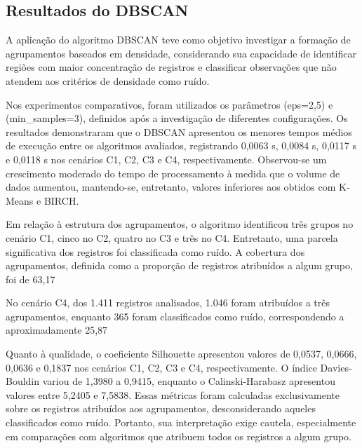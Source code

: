 \documentclass[lettersize,journal]{IEEEtran}
\begin{document}
\subsection{Resultados do DBSCAN}
A aplicação do algoritmo DBSCAN teve como objetivo investigar a formação de agrupamentos baseados em densidade, considerando sua capacidade de identificar regiões com maior concentração de registros e classificar observações que não atendem aos critérios de densidade como ruído.

Nos experimentos comparativos, foram utilizados os parâmetros (eps=2,5) e (min\_samples=3), definidos após a investigação de diferentes configurações. Os resultados demonstraram que o DBSCAN apresentou os menores tempos médios de execução entre os algoritmos avaliados, registrando 0,0063 s, 0,0084 s, 0,0117 s e 0,0118 s nos cenários C1, C2, C3 e C4, respectivamente. Observou-se um crescimento moderado do tempo de processamento à medida que o volume de dados aumentou, mantendo-se, entretanto, valores inferiores aos obtidos com K-Means e BIRCH.

Em relação à estrutura dos agrupamentos, o algoritmo identificou três grupos no cenário C1, cinco no C2, quatro no C3 e três no C4. Entretanto, uma parcela significativa dos registros foi classificada como ruído. A cobertura dos agrupamentos, definida como a proporção de registros atribuídos a algum grupo, foi de 63,17%

No cenário C4, dos 1.411 registros analisados, 1.046 foram atribuídos a três agrupamentos, enquanto 365 foram classificados como ruído, correspondendo a aproximadamente 25,87%

Quanto à qualidade, o coeficiente Silhouette apresentou valores de 0,0537, 0,0666, 0,0636 e 0,1837 nos cenários C1, C2, C3 e C4, respectivamente. O índice Davies-Bouldin variou de 1,3980 a 0,9415, enquanto o Calinski-Harabasz apresentou valores entre 5,2405 e 7,5838. Essas métricas foram calculadas exclusivamente sobre os registros atribuídos aos agrupamentos, desconsiderando aqueles classificados como ruído. Portanto, sua interpretação exige cautela, especialmente em comparações com algoritmos que atribuem todos os registros a algum grupo.
\end{document}
